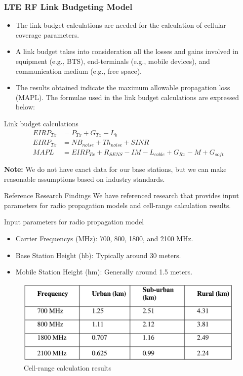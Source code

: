 \begin{frame}
    \frametitle{LTE RF Link Budgeting Model}
    \begin{itemize}
        \item The link budget calculations are needed for the calculation of cellular coverage parameters.
        \item A link budget takes into consideration all the losses and gains involved in equipment (e.g., BTS), end-terminals (e.g., mobile devices), and communication medium (e.g., free space).
        \item The results obtained indicate the maximum allowable propagation loss (MAPL). The formulae used in the link budget calculations are expressed below:
    \end{itemize}
    \begin{block}{Link budget calculations}
        \begin{align}
            EIRP_{Tx} &= P_{Tx} + G_{Tx} - L_b \\
            EIRP_{Tx} &= NB_{noise} + Th_{noise} + SINR \\
            MAPL &= EIRP_{Tx} + R_{SENS} - IM - L_{cable} + G_{Rx} - M + G_{soft}
        \end{align}
    \end{block}
    \textbf{Note:} We do not have exact data for our base stations, but we can make reasonable assumptions based on industry standards.
    \end{frame}

\begin{frame}{Reference Research Findings}
    We have referenced research that provides input parameters for radio propagation models and cell-range calculation results.
    \begin{block}{Input parameters for radio propagation model}
        \begin{itemize}
            \item Carrier Frequencys (MHz): 700, 800, 1800, and 2100 MHz.
            \item Base Station Height (hb): Typically around 30 meters.
            \item Mobile Station Height (hm): Generally around 1.5 meters.
        \end{itemize}
    \end{block}
    \begin{figure}
        \includegraphics[height=0.35\paperheight]{images/Altair/cell_range_calc_res.png}
        \caption{Cell-range calculation results}
    \end{figure}
\end{frame}

